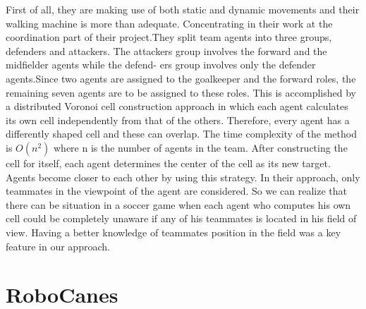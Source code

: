 First of all, they are making use of both static and dynamic movements and their walking machine is more than adequate. Concentrating in their work at the coordination part of their project.They split team agents into three groups, defenders and attackers. The attackers group involves the forward and the midfielder agents while the defend-
ers group involves only the defender agents.Since two agents are assigned to the
goalkeeper and the forward roles, the remaining seven agents are to be assigned
to these roles. This
is accomplished by a distributed Voronoi cell construction approach in which
each agent calculates its own cell independently from that of the others. Therefore, every agent has a differently shaped cell and these can overlap. The time complexity of the method is $O(n^{2})$ where n is the number of agents in the team. After constructing the cell
for itself, each agent determines the center of the cell as its new target. Agents
become closer to each other by using this strategy. In their approach, only teammates in the viewpoint of the agent are considered. So we can realize that there can be situation in a soccer game when each agent who computes his own cell could be completely unaware if any of his teammates is located in his field of view. Having a better knowledge of teammates position in the field was a key feature in our approach.


\section{RoboCanes}







